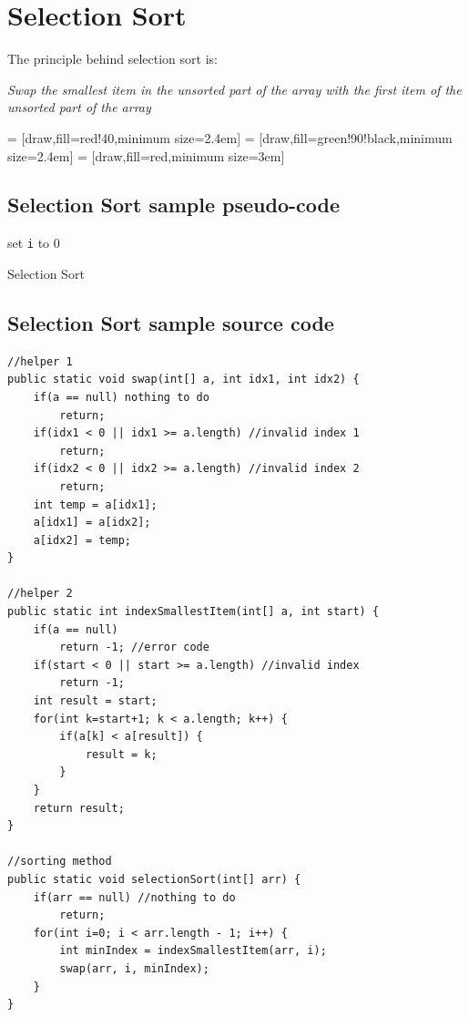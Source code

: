

\section{Selection Sort}

The principle behind selection sort is:

\begin{center}
	\emph{
		Swap the smallest item in the unsorted part of the array with the first item of the unsorted part of the array}
\end{center}

 = [draw,fill=red!40,minimum size=2.4em]
 = [draw,fill=green!90!black,minimum size=2.4em]
 = [draw,fill=red,minimum size=3em]


\subsection{Selection Sort sample pseudo-code}

\IncMargin{1em}
\begin{algorithm}[H]
	\SetAlgoLined
{}
set \texttt{i} to 0\;
\caption{Selection Sort \label{selectionsort}}
\end{algorithm}

\newpage
\subsection{Selection Sort sample source code}

\begin{lstlisting}[basicstyle=\small]
//helper 1
public static void swap(int[] a, int idx1, int idx2) {
	if(a == null) nothing to do 
		return;
	if(idx1 < 0 || idx1 >= a.length) //invalid index 1
		return;
	if(idx2 < 0 || idx2 >= a.length) //invalid index 2
		return;
	int temp = a[idx1];
	a[idx1] = a[idx2];
	a[idx2] = temp;
}

//helper 2
public static int indexSmallestItem(int[] a, int start) {
	if(a == null) 
		return -1; //error code
	if(start < 0 || start >= a.length) //invalid index
		return -1;
	int result = start; 
	for(int k=start+1; k < a.length; k++) {
		if(a[k] < a[result]) {
			result = k;
		}
	}
	return result;
}

//sorting method
public static void selectionSort(int[] arr) {
	if(arr == null) //nothing to do
		return;
	for(int i=0; i < arr.length - 1; i++) {
		int minIndex = indexSmallestItem(arr, i);	
		swap(arr, i, minIndex);
	}
}
\end{lstlisting}

